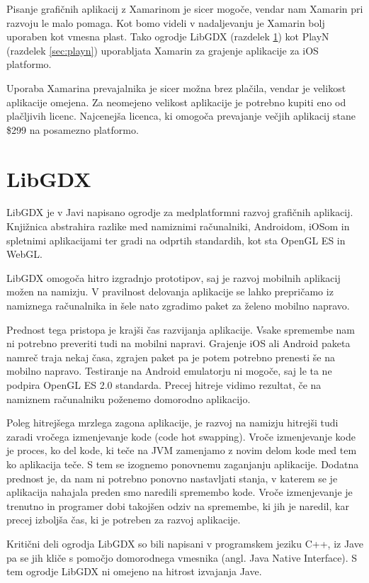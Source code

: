 Pisanje grafičnih aplikacij z Xamarinom je sicer mogoče, vendar nam Xamarin pri razvoju le malo pomaga. Kot bomo videli v nadaljevanju je Xamarin bolj uporaben kot vmesna plast. Tako ogrodje LibGDX (razdelek \ref{sec:libgdx}) kot PlayN (razdelek \ref{sec:playn}) uporabljata Xamarin za grajenje aplikacije za iOS platformo.

Uporaba Xamarina prevajalnika je sicer možna brez plačila, vendar je velikost aplikacije omejena. Za neomejeno velikost aplikacije je potrebno kupiti eno od plačljivih licenc. Najcenejša licenca, ki omogoča prevajanje večjih aplikacij stane \$299 na posamezno platformo.

\section{LibGDX}
\label{sec:libgdx}
LibGDX \cite{libgdx} je v Javi napisano ogrodje za medplatformni razvoj grafičnih aplikacij. Knjižnica abstrahira razlike med namiznimi računalniki, Androidom, iOSom in spletnimi aplikacijami ter gradi na odprtih standardih, kot sta OpenGL ES in WebGL.

LibGDX omogoča hitro izgradnjo prototipov, saj je razvoj mobilnih aplikacij možen na namizju. V pravilnost delovanja aplikacije se lahko prepričamo iz namiznega računalnika in šele nato zgradimo paket za želeno mobilno napravo. 

Prednost tega pristopa je krajši čas razvijanja aplikacije. Vsake spremembe nam ni potrebno preveriti tudi na mobilni napravi. Grajenje iOS ali Android paketa namreč traja nekaj časa, zgrajen paket pa je potem potrebno prenesti še na mobilno napravo. Testiranje na Android emulatorju ni mogoče, saj le ta ne podpira OpenGL ES 2.0 standarda. Precej hitreje vidimo rezultat, če na namiznem računalniku poženemo domorodno aplikacijo.

Poleg hitrejšega mrzlega zagona aplikacije, je razvoj na namizju hitrejši tudi zaradi vročega izmenjevanje kode (code hot swapping). Vroče izmenjevanje kode je proces, ko del kode, ki teče na JVM zamenjamo z novim delom kode med tem ko aplikacija teče. S tem se izognemo ponovnemu zaganjanju aplikacije. Dodatna prednost je, da nam ni potrebno ponovno nastavljati stanja, v katerem se je aplikacija nahajala preden smo naredili spremembo kode. Vroče izmenjevanje je trenutno in programer dobi takojšen odziv na spremembe, ki jih je naredil, kar precej izboljša čas, ki je potreben za razvoj aplikacije.

Kritični deli ogrodja LibGDX so bili napisani v programskem jeziku C++, iz Jave pa se jih kliče s pomočjo domorodnega vmesnika (angl. Java Native Interface). S tem ogrodje LibGDX ni omejeno na hitrost izvajanja Jave.

